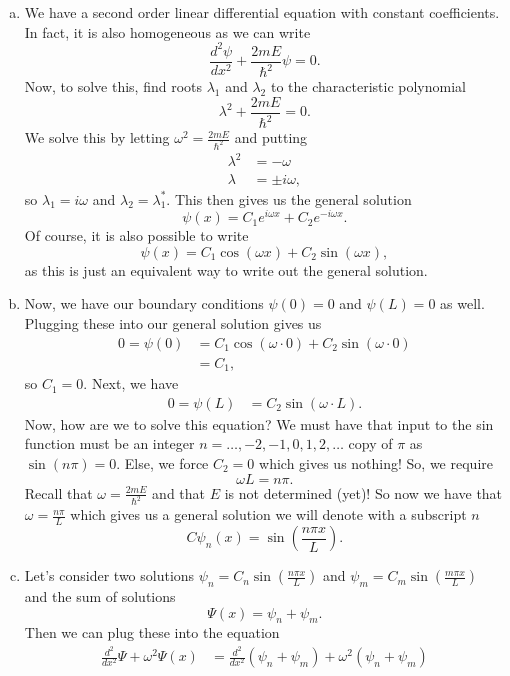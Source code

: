 \documentclass[12pt]{article} %
\begin{document}
\begin{solution}
\begin{enumerate}[(a)]
    \item We have a second order linear differential equation with constant coefficients. In fact, it is also homogeneous as we can write 
\[
\frac{d^2\psi}{dx^2}+\frac{2mE}{\hbar^2}\psi =0.
\]
Now, to solve this, find roots $\lambda_1$ and $\lambda_2$ to the characteristic polynomial
\[
\lambda^2+\frac{2mE}{\hbar^2}=0.
\]
We solve this by letting $\omega^2 = \frac{2mE}{\hbar^2}$ and putting
\begin{align*}
    \lambda^2&=-\omega\\
    \lambda&=\pm i \omega,
\end{align*}
so $\lambda_1=i\omega$ and $\lambda_2=\lambda_1^*$. This then gives us the general solution
\[
\psi(x)=C_1 e^{i\omega x}+C_2 e^{-i\omega x}.
\]
Of course, it is also possible to write 
\[
\psi(x)=C_1\cos(\omega x)+C_2\sin(\omega x),
\]
as this is just an equivalent way to write out the general solution. 
\item Now, we have our boundary conditions $\psi(0)=0$ and $\psi(L)=0$ as well.  Plugging these into our general solution gives us
\begin{align*}
    0=\psi(0)&=C_1 \cos(\omega \cdot 0)+C_2 \sin(\omega \cdot 0)\\
    &= C_1,
\end{align*}
so $C_1=0$.  Next, we have
\begin{align*}
    0=\psi(L)&=C_2\sin(\omega \cdot L).
\end{align*}
Now, how are we to solve this equation? We must have that input to the sin function must be an integer $n=\dots,-2,-1,0,1,2,\dots$ copy of $\pi$ as $\sin(n\pi)=0$. Else, we force $C_2=0$ which gives us nothing!  So, we require
\[
\omega L = n\pi.
\]
Recall that $\omega = \frac{2mE}{\hbar^2}$ and that $E$ is not determined (yet)! So now we have that $\omega = \frac{n\pi}{L}$ which gives us a general solution we will denote with a subscript $n$
\[
C\psi_n(x)=\sin\left(\frac{n\pi x}{L}\right).
\]
\item Let's consider two solutions $\psi_n=C_n\sin\left(\frac{n\pi x}{L}\right)$ and $\psi_m=C_m\sin\left(\frac{m\pi x}{L}\right)$ and the sum of solutions
\[
\Psi(x)=\psi_n + \psi_m.
\]
Then we can plug these into the equation
\begin{align*}
    \frac{d^2}{dx^2}\Psi + \omega^2 \Psi(x)&=\frac{d^2}{dx^2}(\psi_n + \psi_m)+\omega^2(\psi_n+\psi_m)\\ 

\end{align*}
\end{enumerate}
\end{solution}
\end{document}
